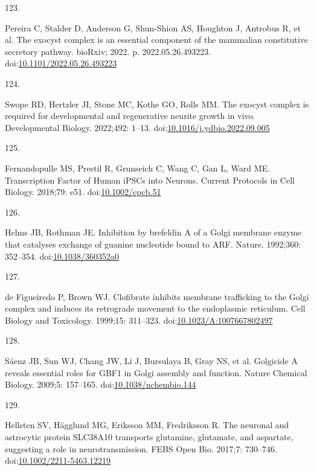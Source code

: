 \documentclass[
  12pt,
  a4paper,
]{book}
\newlength{\cslhangindent}
\newlength{\csllabelwidth}
\newlength{\cslentryspacingunit} %
\newenvironment{CSLReferences}[2] %
 {%
  \setlength{\parindent}{0pt}
  \ifodd #1
  \let\oldpar\par
  \def\par{\hangindent=\cslhangindent\oldpar}
  \fi
  \setlength{\parskip}{#2\cslentryspacingunit}
 }%
 {}
\newcommand{\CSLLeftMargin}[1]{\parbox[t]{\csllabelwidth}{#1}}
\newcommand{\CSLRightInline}[1]{\parbox[t]{\linewidth - \csllabelwidth}{#1}\break}
\begin{document}
\begin{CSLReferences}{0}{0}
\leavevmode{}%
\CSLLeftMargin{123. }%
\CSLRightInline{Pereira C, Stalder D, Anderson G, Shun-Shion AS, Houghton J, Antrobus R, et al. The exocyst complex is an essential component of the mammalian constitutive secretory pathway. {bioRxiv}; 2022. p. 2022.05.26.493223. doi:\href{https://doi.org/10.1101/2022.05.26.493223}{10.1101/2022.05.26.493223}}

\leavevmode{}%
\CSLLeftMargin{124. }%
\CSLRightInline{Swope RD, Hertzler JI, Stone MC, Kothe GO, Rolls MM. The exocyst complex is required for developmental and regenerative neurite growth in vivo. Developmental Biology. 2022;492: 1--13. doi:\href{https://doi.org/10.1016/j.ydbio.2022.09.005}{10.1016/j.ydbio.2022.09.005}}

\leavevmode{}%
\CSLLeftMargin{125. }%
\CSLRightInline{Fernandopulle MS, Prestil R, Grunseich C, Wang C, Gan L, Ward ME. Transcription {Factor}\textendash{{Mediated Differentiation}} of {Human iPSCs} into {Neurons}. Current Protocols in Cell Biology. 2018;79: e51. doi:\href{https://doi.org/10.1002/cpcb.51}{10.1002/cpcb.51}}

\leavevmode{}%
\CSLLeftMargin{126. }%
\CSLRightInline{Helms JB, Rothman JE. Inhibition by brefeldin {A} of a {Golgi} membrane enzyme that catalyses exchange of guanine nucleotide bound to {ARF}. Nature. 1992;360: 352--354. doi:\href{https://doi.org/10.1038/360352a0}{10.1038/360352a0}}

\leavevmode{}%
\CSLLeftMargin{127. }%
\CSLRightInline{de Figueiredo P, Brown WJ. Clofibrate inhibits membrane trafficking to the {Golgi} complex and induces its retrograde movement to the endoplasmic reticulum. Cell Biology and Toxicology. 1999;15: 311--323. doi:\href{https://doi.org/10.1023/A:1007667802497}{10.1023/A:1007667802497}}

\leavevmode{}%
\CSLLeftMargin{128. }%
\CSLRightInline{Sáenz JB, Sun WJ, Chang JW, Li J, Bursulaya B, Gray NS, et al. Golgicide {A} reveals essential roles for {GBF1} in {Golgi} assembly and function. Nature Chemical Biology. 2009;5: 157--165. doi:\href{https://doi.org/10.1038/nchembio.144}{10.1038/nchembio.144}}

\leavevmode{}%
\CSLLeftMargin{129. }%
\CSLRightInline{Hellsten SV, Hägglund MG, Eriksson MM, Fredriksson R. The neuronal and astrocytic protein {SLC38A10} transports glutamine, glutamate, and aspartate, suggesting a role in neurotransmission. FEBS Open Bio. 2017;7: 730--746. doi:\href{https://doi.org/10.1002/2211-5463.12219}{10.1002/2211-5463.12219}}


\end{CSLReferences}
\end{document}
